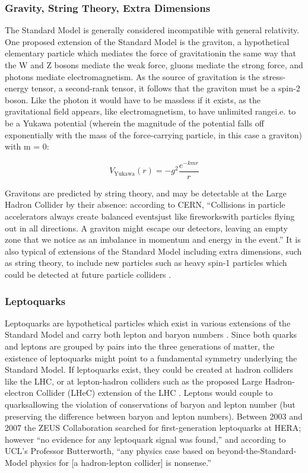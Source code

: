 \subsubsection{Gravity, String Theory, Extra Dimensions}
The Standard Model is generally considered incompatible with general relativity. One proposed extension of the Standard Model is the graviton, a hypothetical elementary particle which mediates the force of gravitation\textendash in the same way that the W and Z bosons mediate the weak force, gluons mediate the strong force, and photons mediate electromagnetism. As the source of gravitation is the stress-energy tensor, a second-rank tensor, it follows that the graviton must be a spin-2 boson. Like the photon it would have to be massless if it exists, as the gravitational field appears, like electromagnetism, to have unlimited range\textendash i.e. to be a Yukawa potential (wherein the magnitude of the potential falls off exponentially with the mass of the force-carrying particle, in this case a graviton) with m = 0:

\begin{equation*}
V_\text{Yukawa}(r)= -g^2\frac{e^{-kmr}}{r}
\end{equation*}

Gravitons are predicted by string theory, and may be detectable at the Large Hadron Collider by their absence: according to CERN, ``Collisions in particle accelerators always create balanced events\textendash just like fireworks\textendash with particles flying out in all directions. A graviton might escape our detectors, leaving an empty zone that we notice as an imbalance in momentum and energy in the event.'' \cite{CERN:Gravitons:Online,deAquino:Gravitons} It is also typical of extensions of the Standard Model including extra dimensions, such as string theory, to include new particles such as heavy spin-1 particles which could be detected at future particle colliders \cite{CLIC:Concept}.

\subsubsection{Leptoquarks}
Leptoquarks are hypothetical particles which exist in various extensions of the Standard Model and carry both lepton and baryon numbers \cite{PDG:Leptoquark}. Since both quarks and leptons are grouped by pairs into the three generations of matter, the existence of leptoquarks might point to a fundamental symmetry underlying the Standard Model. If leptoquarks exist, they could be created at hadron colliders like the LHC, or at lepton-hadron colliders such as the proposed Large Hadron-electron Collider (LHeC) extension of the LHC \cite{Waters:Interview}. Leptons would couple to quarks\textendash allowing the violation of conservations of baryon and lepton number (but preserving the difference between baryon and lepton numbers). Between 2003 and 2007 the ZEUS Collaboration searched for first-generation leptoquarks at HERA; however ``no evidence for any leptoquark signal was found,'' \cite{ZEUS:Leptoquark} and according to UCL's Professor Butterworth, ``any physics case based on beyond-the-Standard-Model physics for [a hadron-lepton collider] is nonsense.'' \cite{Butterworth:Interview}

